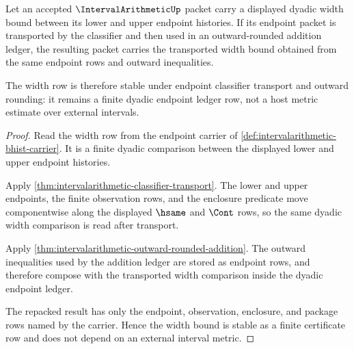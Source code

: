 \begin{theorem}
\label{thm:intervalarithmetic-width-bound-stability}
Let an accepted $\IntervalArithmeticUp$ packet carry a displayed dyadic width
bound between its lower and upper endpoint histories. If its endpoint packet
is transported by the classifier and then used in an outward-rounded addition
ledger, the resulting packet carries the transported width bound obtained from
the same endpoint rows and outward inequalities.

The width row is therefore stable under endpoint classifier transport and
outward rounding: it remains a finite dyadic endpoint ledger row, not a host
metric estimate over external intervals.
\end{theorem}
\begin{proof}
Read the width row from the endpoint carrier of
\autoref{def:intervalarithmetic-bhist-carrier}. It is a finite dyadic
comparison between the displayed lower and upper endpoint histories.

Apply \autoref{thm:intervalarithmetic-classifier-transport}. The lower and
upper endpoints, the finite observation rows, and the enclosure predicate move
componentwise along the displayed $\hsame$ and $\Cont$ rows, so the same
dyadic width comparison is read after transport.

Apply \autoref{thm:intervalarithmetic-outward-rounded-addition}. The outward
inequalities used by the addition ledger are stored as endpoint rows, and
therefore compose with the transported width comparison inside the dyadic
endpoint ledger.

The repacked result has only the endpoint, observation, enclosure, and
package rows named by the carrier. Hence the width bound is stable as a
finite certificate row and does not depend on an external interval metric.
\end{proof}

